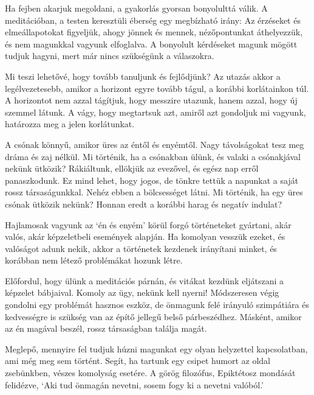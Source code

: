 Ha fejben akarjuk megoldani, a gyakorlás gyorsan bonyolulttá válik. A
meditációban, a testen keresztüli éberség egy megbízható irány: Az
érzéseket és elmeállapotokat figyeljük, ahogy jönnek és mennek,
nézőpontunkat áthelyezzük, és nem magunkkal vagyunk elfoglalva. A
bonyolult kérdéseket magunk mögött tudjuk hagyni, mert már nincs
szükségünk a válaszokra.


Mi teszi lehetővé, hogy tovább tanuljunk és fejlődjünk? Az utazás akkor
a legélvezetesebb, amikor a horizont egyre tovább tágul, a korábbi
korlátainkon túl. A horizontot nem azzal tágítjuk, hogy messzire
utazunk, hanem azzal, hogy új szemmel látunk. A vágy, hogy megtartsuk
azt, amiről azt gondoljuk mi vagyunk, határozza meg a jelen korlátunkat.

A csónak könnyű, amikor üres az éntől és enyémtől. Nagy távolságokat
tesz meg dráma és zaj nélkül. Mi történik, ha a csónakban ülünk, és
valaki a csónakjával nekünk ütközik? Rákiáltunk, ellökjük az evezővel,
és egész nap erről panaszkodunk. Ez mind lehet, hogy jogos, de tönkre
tettük a napunkat a saját rossz társaságunkkal. Nehéz ebben a
bölcsességet látni. Mi történik, ha egy üres csónak ütközik nekünk?
Honnan eredt a korábbi harag és negatív indulat?

Hajlamosak vagyunk az `én és enyém' körül forgó történeteket gyártani,
akár valós, akár képzeletbeli események alapján. Ha komolyan vesszük
ezeket, és valóságot adunk nekik, akkor a történetek kezdenek irányítani
minket, és korábban nem létező problémákat hozunk létre.

Előfordul, hogy ülünk a meditációs párnán, és vitákat kezdünk eljátszani
a képzelet bábjaival. Komoly az ügy, nekünk kell nyerni! Módszeresen
végig gondolni egy problémát hasznos eszköz, de önmagunk felé irányuló
szimpátiára és kedvességre is szükség van az építő jellegű belső
párbeszédhez. Másként, amikor az én magával beszél, rossz társaságban
találja magát.

\clearpage

\vspace*{-\baselineskip}


Meglepő, mennyire fel tudjuk húzni magunkat egy olyan helyzettel
kapcsolatban, ami még meg sem történt. Segít, ha tartunk egy csipet
humort az oldal zsebünkben, vészes komolyság esetére. A görög filozófus,
Epiktétosz mondását felidézve, `Aki tud önmagán nevetni, sosem fogy ki a
nevetni valóból.'


